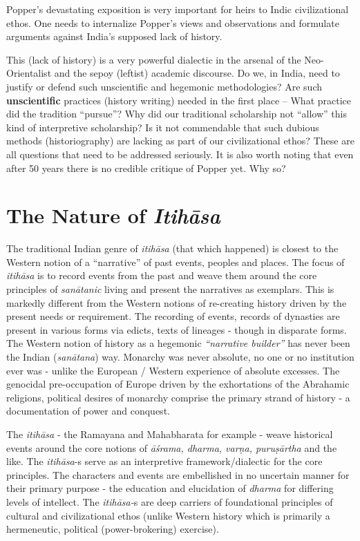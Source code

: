 Popper’s devastating exposition is very important for heirs to Indic civilizational ethos. One needs to internalize Popper’s views and observations and formulate arguments against India’s supposed lack of history. 

This (lack of history) is a very powerful dialectic in the arsenal of the Neo-Orientalist and the sepoy (leftist) academic discourse. Do we, in India, need to justify or defend such unscientific and hegemonic methodologies? Are such \textbf{unscientific} practices (history writing) needed in the first place – What practice did the tradition “pursue”? Why did our traditional scholarship not “allow” this kind of interpretive scholarship? Is it not commendable that such dubious methods (historiography) are lacking as part of our civilizational ethos? These are all questions that need to be addressed seriously. It is also worth noting that even after 50 years there is no credible critique of Popper yet. Why so?


\section*{The Nature of \textit{Itihāsa}}

The traditional Indian genre of \textit{itihāsa} (that which happened) is closest to the Western notion of a “narrative” of past events, peoples and places. The focus of \textit{itihāsa} is to record events from the past and weave them around the core principles of \textit{sanātanic} living and present the narratives as exemplars. This is markedly different from the Western notions of re-creating history driven by the present needs or requirement. The recording of events, records of dynasties are present in various forms via edicts, texts of lineages - though in disparate forms. The Western notion of history as a hegemonic \textit{“narrative builder”} has never been the Indian (\textit{sanātana}) way. Monarchy was never absolute, no one or no institution ever was - unlike the European / Western experience of absolute excesses. The genocidal pre-occupation of Europe driven by the exhortations of the Abrahamic religions, political desires of monarchy comprise the primary strand of history - a documentation of power and conquest.

The \textit{itihāsa} - the Ramayana and Mahabharata for example - weave historical events around the core notions of \textit{āśrama, dharma, varṇa, puruṣārtha} and the like. The \textit{itihāsa}-s serve as an interpretive framework/dialectic for the core principles. The characters and events are embellished in no uncertain manner for their primary purpose - the education and elucidation of \textit{dharma} for differing levels of intellect. The \textit{itihāsa-}s are deep carriers of foundational principles of cultural and civilizational ethos (unlike Western history which is primarily a hermeneutic, political (power-brokering) exercise).

